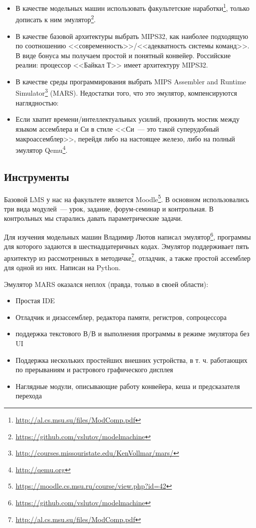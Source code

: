 \documentclass[10pt, a5paper]{article}
\begin{document}
\begin{itemize}
  \item В качестве модельных машин использовать факультетские наработки\footnote{\url{http://al.cs.msu.su/files/ModComp.pdf}}, только дописать к ним эмулятор\footnote{\url{https://github.com/vslutov/modelmachine}}.
  \item В качестве базовой архитектуры выбрать MIPS32, как наиболее подходящую по соотношению <<современность>>/\linebreak<<адекватность системы команд>>. В виде бонуса мы получаем простой и понятный конвейер. Российские реалии: процессор <<Байкал Т>> имеет архитектуру MIPS32.
  \item В качестве среды программирования выбрать MIPS Assembler and Runtime Simulator\footnote{\url{http://courses.missouristate.edu/KenVollmar/mars/}} (MARS). Недостатки того, что это эмулятор, компенсируются наглядностью:

  \item Если хватит времени/интеллектуальных усилий, прокинуть мостик между языком ассемблера и Си в стиле <<Си~--- это такой суперудобный макроассемблер>>, перейдя либо на настоящее железо, либо на полный эмулятор Qemu\footnote{\url{http://qemu.org}}.
\end{itemize}

\subsection*{Инструменты}

Базовой LMS у нас на факультете является Moodle\footnote{\url{https://moodle.cs.msu.ru/course/view.php?id=42}}. В основном использовались три вида модулей~--- урок, задание, форум-семинар и контрольная. В контрольных мы старались давать параметрические задачи.

Для изучения модельных машин Владимир Лютов написал эмулятор\footnote{\url{https://github.com/vslutov/modelmachine}}, программы для которого задаются в шестнадцатеричных кодах. Эмулятор поддерживает пять архитектур из рассмотренных в методичке\footnote{\url{http://al.cs.msu.su/files/ModComp.pdf}}, отладчик, а также простой ассемблер для одной из них. Написан на Python.

Эмулятор MARS оказался неплох (правда, только в своей области):

\begin{itemize}
  \item Простая IDE
  \item Отладчик и дизассемблер, редактора памяти, регистров, сопроцессора
  \item поддержка текстового В/В и выполнения программы в режиме эмулятора без UI
  \item Поддержка нескольких простейших внешних устройства, в т. ч. работающих по прерываниям и растрового графического дисплея
  \item Наглядные модули, описывающие работу конвейера, кеша и предсказателя перехода
\end{itemize}
\end{document}
